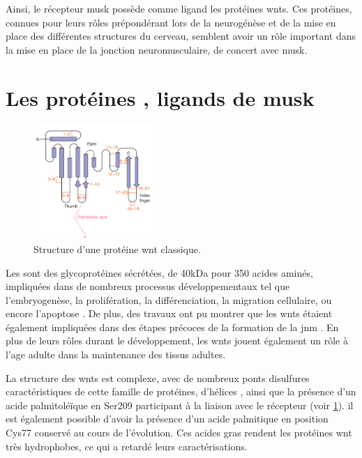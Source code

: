 	Ainsi, le récepteur \gls{musk} possède comme ligand les protéines \glspl{wnt}. Ces protéines, connues pour leurs rôles prépondérant lors de la neurogénèse et de la mise en place des différentes structures du cerveau, semblent avoir un rôle important dans la mise en place de la jonction neuromusculaire, de concert avec \gls{musk}.
	

\section{Les protéines , ligands de \acrshort{musk}}
\label{sec:IntroWnt}	
	\begin{figure}
		\includegraphics[width=0.4\textwidth]{./Images/WntProtein.png}	
		\caption{Structure d'une protéine \Gls{wnt} classique.}
		\label{fig:WntProt}
	\end{figure}
	
	Les  sont des glycoprotéines sécrétées, de 40kDa pour 350 acides aminés, impliquées dans de nombreux processus développementaux tel que l'embryogenèse, la prolifération, la différenciation, la migration cellulaire, ou encore l'apoptose \cite{Miller2002, Willert2012}. De plus, des travaux ont pu montrer que les \Glspl{wnt} étaient également impliquées dans des étapes précoces de la formation de la \gls{jnm} \cite{Hall2000}. En plus de leurs rôles durant le développement, les \Glspl{wnt} jouent également un rôle à l'age adulte dans la maintenance des tissus adultes. 
	
	La structure des \Glspl{wnt} est complexe, avec  de nombreux ponts disulfures caractéristiques de cette famille de protéines, d'hélices \textalpha{}, ainsi que la présence d'un acide palmitoléïque en Ser209 \cite{Takada2006} participant à la liaison avec le récepteur (voir \cref{fig:WntProt}). il est également possible d'avoir la présence d'un acide palmitique en position Cys77 \cite{Takada2006} conservé au cours de l'évolution. Ces acides gras rendent les protéines \Gls{wnt} très hydrophobes, ce qui a retardé leurs caractérisations.
	
